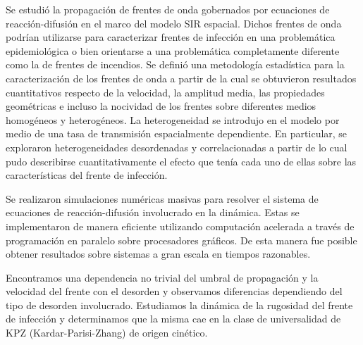 \begin{resumen}
    Se estudió la propagación de frentes de onda gobernados por ecuaciones de reacción-difusión en el marco del modelo SIR espacial.
    Dichos frentes de onda podrían utilizarse para caracterizar frentes de infección en una problemática epidemiológica o bien orientarse a una problemática completamente
    diferente como la de frentes de incendios. Se definió una metodología estadística para la caracterización de los frentes de onda a partir de la cual se obtuvieron
    resultados cuantitativos respecto de la velocidad, la amplitud media, las propiedades geométricas e incluso la nocividad de los frentes sobre diferentes medios homogéneos y heterogéneos. La heterogeneidad se introdujo en el modelo por medio de una tasa de transmisión espacialmente dependiente. En particular, se exploraron heterogeneidades desordenadas y correlacionadas a partir de lo cual pudo describirse cuantitativamente el efecto que tenía
    cada uno de ellas sobre las características del frente de infección.
     
    Se realizaron simulaciones numéricas masivas para resolver el sistema de ecuaciones de reacción-difusión involucrado en la dinámica. Estas se implementaron
    de manera eficiente utilizando computación acelerada a través de programación en paralelo sobre procesadores gráficos. De esta manera fue posible obtener resultados
    sobre sistemas a gran escala en tiempos razonables.

    Encontramos una dependencia no trivial del umbral de propagación y la velocidad del frente con el desorden y observamos diferencias dependiendo del tipo de desorden involucrado. Estudiamos la dinámica de la rugosidad del frente de infección y determinamos que la misma cae en la clase de universalidad de KPZ (Kardar-Parisi-Zhang) de origen cinético.
\end{resumen}

